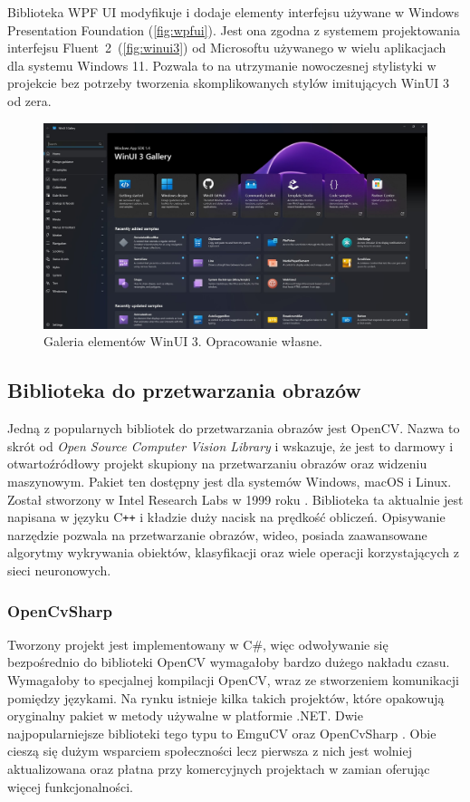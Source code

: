 Biblioteka WPF UI \cite{wpfui} modyfikuje i dodaje elementy interfejsu używane w Windows Presentation Foundation (\autoref{fig:wpfui}). 
Jest ona zgodna z systemem projektowania interfejsu Fluent~2~(\autoref{fig:winui3}) od Microsoftu używanego w wielu aplikacjach dla systemu Windows 11. 
Pozwala to na utrzymanie nowoczesnej stylistyki w projekcie bez potrzeby tworzenia skomplikowanych stylów imitujących WinUI 3 od zera.

\begin{figure}[H]
    \centering
    \includegraphics[width=0.9\linewidth]{./images/Picture9.jpg}
    \caption{Galeria elementów WinUI 3. Opracowanie własne.}
    \label{fig:winui3}
\end{figure}

\subsection{Biblioteka do przetwarzania obrazów}
Jedną z popularnych bibliotek do przetwarzania obrazów jest OpenCV.
Nazwa to skrót od \textit{Open Source Computer Vision Library} i wskazuje, że jest to darmowy i otwartoźródłowy projekt skupiony na przetwarzaniu obrazów oraz widzeniu maszynowym.
Pakiet ten dostępny jest dla systemów Windows, macOS i Linux. 
Został stworzony w Intel Research Labs w 1999 roku \cite{opencvHistory}. 
Biblioteka ta aktualnie jest napisana w języku C\texttt{++} i kładzie duży nacisk na prędkość obliczeń. 
Opisywanie narzędzie pozwala na przetwarzanie obrazów, wideo, posiada zaawansowane algorytmy wykrywania obiektów, klasyfikacji oraz wiele operacji korzystających z sieci neuronowych.

\subsubsection{OpenCvSharp}

Tworzony projekt jest implementowany w C\#, więc odwoływanie się bezpośrednio do biblioteki OpenCV wymagałoby bardzo dużego nakładu czasu. Wymagałoby to specjalnej kompilacji OpenCV, wraz ze stworzeniem komunikacji pomiędzy językami. Na rynku istnieje kilka takich projektów, które opakowują oryginalny pakiet w metody używalne w platformie .NET. Dwie najpopularniejsze biblioteki tego typu to EmguCV \cite{emgucv} oraz OpenCvSharp \cite{opencvsharp}. 
Obie cieszą się dużym wsparciem społeczności lecz pierwsza z nich jest wolniej aktualizowana oraz płatna przy komercyjnych projektach w zamian oferując więcej funkcjonalności.

